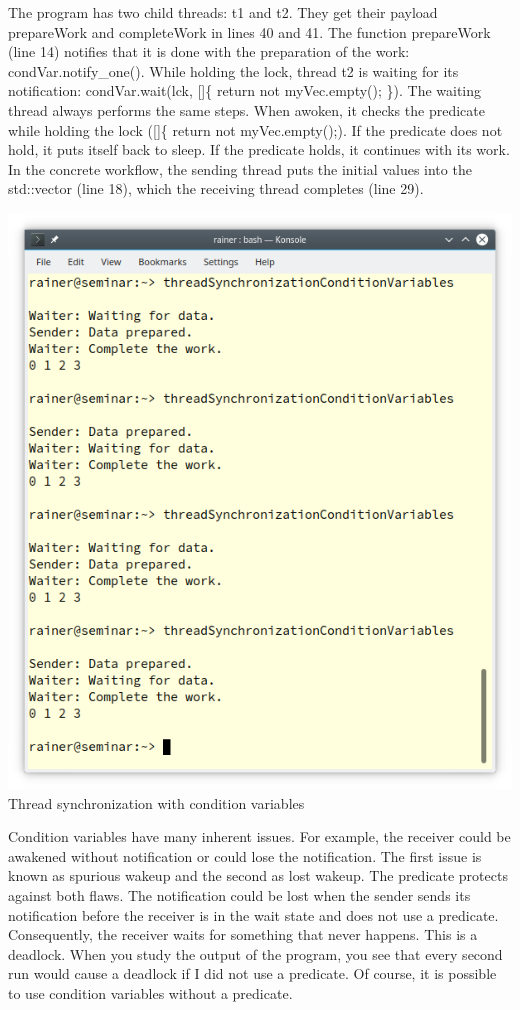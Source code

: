 The program has two child threads: t1 and t2. They get their payload prepareWork and completeWork in lines 40 and 41. The function prepareWork (line 14) notifies that it is done with the preparation of the work: condVar.notify\_one(). While holding the lock, thread t2 is waiting for its notification: condVar.wait(lck, []\{ return not myVec.empty(); \}). The waiting thread always performs the same steps. When awoken, it checks the predicate while holding the lock ([]\{ return not myVec.empty();). If the predicate does not hold, it puts itself back to sleep. If the predicate holds, it continues with its work. In the concrete workflow, the sending thread puts the initial values into the std::vector (line 18), which the receiving thread completes (line 29).

\begin{center}
\includegraphics[width=1.0\textwidth]{content/3/chapter6/images/12.png}\\
Thread synchronization with condition variables
\end{center}

Condition variables have many inherent issues. For example, the receiver could be awakened without notification or could lose the notification. The first issue is known as spurious wakeup and the second as lost wakeup. The predicate protects against both flaws. The notification could be lost when the sender sends its notification before the receiver is in the wait state and does not use a predicate. Consequently, the receiver waits for something that never happens. This is a deadlock. When you study the output of the program, you see that every second run would cause a deadlock if I did not use a predicate. Of course, it is possible to use condition variables without a predicate.

